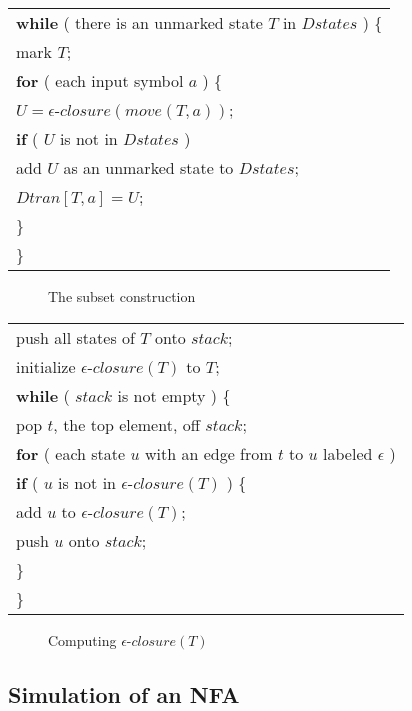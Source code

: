\documentclass[12pt,a4paper,twoside,openany]{book}
\begin{document}
\begin{center}
    \begin{tabular}{l}
        \textbf{while} ( there is an unmarked state $T$ in $Dstates$ ) \{\\
        \qquad mark $T$;\\
        \qquad\textbf{for} ( each input symbol $a$ ) \{\\
        \qquad\qquad$U=\epsilon$-$closure(move(T,a))$;\\
        \qquad\qquad\textbf{if} ( $U$ is not in $Dstates$ )\\
        \qquad\qquad\qquad add $U$ as an unmarked state to $Dstates$;\\
        \qquad\qquad$Dtran[T,a]=U$;\\
        \qquad\}\\
        \}
    \end{tabular}
\end{center}
\begin{figure}[htbp]
    \caption{The subset construction}
    \label{Figure:3.32}
\end{figure}

\begin{center}
    \begin{tabular}{l}
        push all states of $T$ onto $stack$;\\
        initialize $\epsilon$-$closure(T)$ to $T$;\\
        \textbf{while} ( $stack$ is not empty ) \{\\
        \qquad pop $t$, the top element, off $stack$;\\
        \qquad\textbf{for} ( each state $u$ with an edge from $t$ to $u$ labeled $\epsilon$ )\\
        \qquad\qquad\textbf{if} ( $u$ is not in $\epsilon$-$closure(T)$ ) \{\\
        \qquad\qquad\qquad add $u$ to $\epsilon$-$closure(T)$;\\
        \qquad\qquad\qquad push $u$ onto $stack$;\\
        \qquad\qquad\}\\
        \}
    \end{tabular}
\end{center}
\begin{figure}[htbp]
    \caption{Computing $\epsilon$-$closure(T)$}
    \label{Figure:3.33}
\end{figure}

\subsection{Simulation of an NFA}
\end{document}
